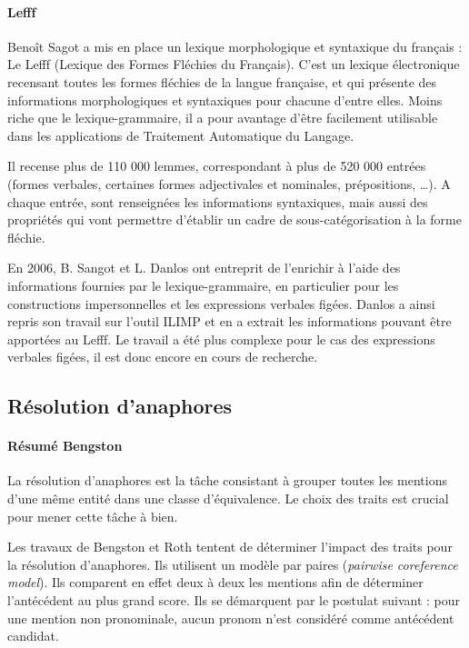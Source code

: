 \documentclass[a4paper,12pt]{article}
\begin{document}
\paragraph{Lefff}
Benoît Sagot a mis en place un lexique morphologique et syntaxique du français : Le Lefff (Lexique des Formes Fléchies du Français). C'est un lexique électronique recensant toutes les formes fléchies de la langue française, et qui présente des informations morphologiques et syntaxiques pour chacune d'entre elles. Moins riche que le lexique-grammaire, il a pour avantage d'être facilement utilisable dans les applications de Traitement Automatique du Langage.

Il recense plus de 110 000 lemmes, correspondant à plus de 520 000 entrées (formes verbales, certaines formes adjectivales et nominales, prépositions, \ldots). A chaque entrée, sont renseignées les informations syntaxiques, mais aussi des propriétés qui vont permettre d'établir un cadre de sous-catégorisation à la forme fléchie.

En 2006, B. Sangot et L. Danlos ont entreprit de l'enrichir à l'aide des informations fournies par le lexique-grammaire, en particulier pour les constructions impersonnelles et les expressions verbales figées. Danlos a ainsi repris son travail sur l'outil ILIMP et en a extrait les informations pouvant être apportées au Lefff. Le travail a été plus complexe pour le cas des expressions verbales figées, il est donc encore en cours de recherche.


\subsection{Résolution d'anaphores}

\paragraph{Résumé Bengston}
La résolution d'anaphores est la tâche consistant à grouper toutes les mentions d'une même entité dans une classe d'équivalence. Le choix des traits est crucial pour mener cette tâche à bien.

Les travaux de Bengston et Roth tentent de déterminer l'impact des traits pour la résolution d'anaphores. Ils utilisent un modèle par paires (\textit{pairwise coreference model}). Ils comparent en effet deux à deux les mentions afin de déterminer l'antécédent au plus grand score. Ils se démarquent par le postulat suivant : pour une mention non pronominale, aucun pronom n'est considéré comme antécédent candidat.
\end{document}
